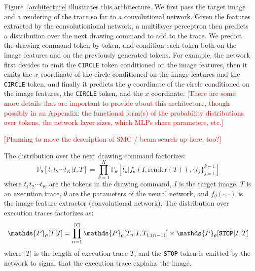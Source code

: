 \documentclass{article}
\newcommand{\probability}{\mathds{P}} %
\newcommand{\remark}[1]{\textcolor{red}{[#1]}}
\begin{document}
Figure~\ref{architecture} illustrates this architecture.  We first
pass the target image and a rendering of the trace so far to a
convolutional network. Given the features extracted by the
convolutionional network, a multilayer perceptron then predicts a
distribution over the next drawing command to add to the trace.  We
predict the drawing command token-by-token, and condition each token
both on the image features and on the previously generated tokens.
For example, the network first decides to emit the \verb|CIRCLE| token
conditioned on the image features, then it emits the $x$ coordinate of
the circle conditioned on the image features and the \verb|CIRCLE|
token, and finally it predicts the $y$ coordinate of the circle
conditioned on the image features, the \verb|CIRCLE| token, and the
$x$ coordinate.
\remark{There are some more details that are important to provide about this architecture, though possibly in an Appendix: the functional form(s) of the probability distributions over tokens, the network layer sizes, which MLPs share parameters, etc.}

\remark{Planning to move the description of SMC / beam search up here, too?}

The distribution over the next drawing command factorizes:
\begin{equation}
  \probability_\theta [t_1t_2\cdots t_K | I,T] = \prod_{k = 1}^K \probability_\theta [t_k | f_\theta(I,\text{render}(T)), \{t_j\}_{j = 1}^{k - 1}]
\end{equation}
where $t_1t_2\cdots t_K$ are the tokens in the drawing command, $I$ is
the target image, $T$ is an execution trace, $\theta$ are the
parameters of the neural network, and $f_\theta(\cdot,\cdot)$ is the
image feature extractor (convolutional network). The distribution over
execution traces factorizes as:
\begin{equation}
  \probability_\theta [T|I] = \prod_{n = 1}^{|T|} \probability_\theta [T_n | I,T_{1:(n-1)}]\times\probability_\theta [\verb|STOP| | I,T]\label{objective}
\end{equation}
where $|T|$ is the length of execution trace $T$, and the \verb|STOP|
token is emitted by the network to signal that the execution trace
explains the image.
\end{document}
